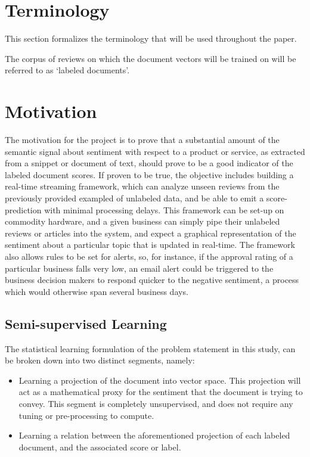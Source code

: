 \documentclass[conference]{IEEEtran}
\begin{document}
\section{Terminology}
This section formalizes the terminology that will be used throughout the paper.

The corpus of reviews on which the document vectors will be trained on will be referred to as `labeled documents'.

\section{Motivation}
The motivation for the project is to prove that a substantial amount of the semantic signal about sentiment with respect to a product or service, as extracted from a snippet or document of text, should prove to be a good indicator of the labeled document scores. If proven to be true, the objective includes building a real-time streaming framework, which can analyze unseen reviews from the previously provided exampled of unlabeled data, and be able to emit a score-prediction with minimal processing delays. This framework can be set-up on commodity hardware, and a given business can simply pipe their unlabeled reviews or articles into the system, and expect a graphical representation of the sentiment about a particular topic that is updated in real-time. The framework also allows rules to be set for alerts, so, for instance, if the approval rating of a particular business falls very low, an email alert could be triggered to the business decision makers to respond quicker to the negative sentiment, a process which would otherwise span several business days.

\subsection{Semi-supervised Learning}
The statistical learning formulation of the problem statement in this study, can be broken down into two distinct segments, namely:
\begin{itemize}
	\item Learning a projection of the document into vector space. This projection will act as a mathematical proxy for the sentiment that the document is trying to convey. This segment is completely unsupervised, and does not require any tuning or pre-processing to compute.
    \item Learning a relation between the aforementioned projection of each labeled document, and the associated score or label.
\end{itemize}
\end{document}

